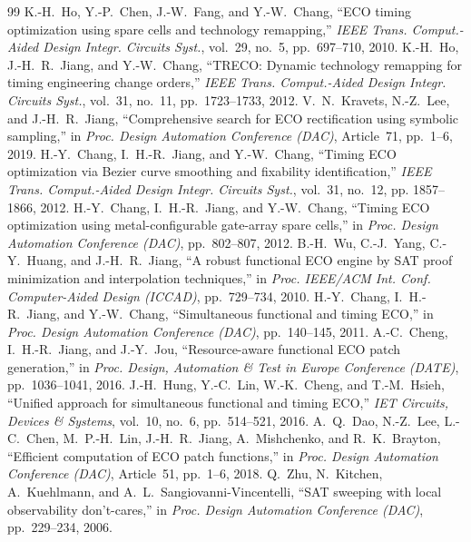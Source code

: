\documentclass[journal]{IEEEtran}
\begin{document}
\begin{thebibliography}{99}
 K.-H.~Ho, Y.-P.~Chen, J.-W.~Fang, and Y.-W.~Chang, ``ECO timing optimization using spare cells and technology remapping,'' \emph{IEEE Trans. Comput.-Aided Design Integr. Circuits Syst.}, vol.~29, no.~5, pp.~697--710, 2010.
 K.-H.~Ho, J.-H.~R.~Jiang, and Y.-W.~Chang, ``TRECO: Dynamic technology remapping for timing engineering change orders,'' \emph{IEEE Trans. Comput.-Aided Design Integr. Circuits Syst.}, vol.~31, no.~11, pp.~1723--1733, 2012.
 V.~N.~Kravets, N.-Z.~Lee, and J.-H.~R.~Jiang, ``Comprehensive search for ECO rectification using symbolic sampling,'' in \emph{Proc. Design Automation Conference (DAC)}, Article~71, pp.~1--6, 2019.
 H.-Y.~Chang, I.~H.-R.~Jiang, and Y.-W.~Chang, ``Timing ECO optimization via Bezier curve smoothing and fixability identification,'' \emph{IEEE Trans. Comput.-Aided Design Integr. Circuits Syst.}, vol.~31, no.~12, pp. 1857--1866, 2012.
 H.-Y.~Chang, I.~H.-R.~Jiang, and Y.-W.~Chang, ``Timing ECO optimization using metal-configurable gate-array spare cells,'' in \emph{Proc. Design Automation Conference (DAC)}, pp.~802--807, 2012.
 B.-H.~Wu, C.-J.~Yang, C.-Y.~Huang, and J.-H.~R.~Jiang, ``A robust functional ECO engine by SAT proof minimization and interpolation techniques,'' in \emph{Proc. IEEE/ACM Int. Conf. Computer-Aided Design (ICCAD)}, pp.~729--734, 2010.
 H.-Y.~Chang, I.~H.-R.~Jiang, and Y.-W.~Chang, ``Simultaneous functional and timing ECO,'' in \emph{Proc. Design Automation Conference (DAC)}, pp.~140--145, 2011.
 A.-C.~Cheng, I.~H.-R.~Jiang, and J.-Y.~Jou, ``Resource-aware functional ECO patch generation,'' in \emph{Proc. Design, Automation \& Test in Europe Conference (DATE)}, pp.~1036--1041, 2016.
 J.-H.~Hung, Y.-C.~Lin, W.-K.~Cheng, and T.-M.~Hsieh, ``Unified approach for simultaneous functional and timing ECO,'' \emph{IET Circuits, Devices \& Systems}, vol.~10, no.~6, pp.~514--521, 2016.
 A.~Q.~Dao, N.-Z.~Lee, L.-C.~Chen, M.~P.-H.~Lin, J.-H.~R.~Jiang, A.~Mishchenko, and R.~K.~Brayton, ``Efficient computation of ECO patch functions,'' in \emph{Proc. Design Automation Conference (DAC)}, Article~51, pp.~1--6, 2018.
 Q.~Zhu, N.~Kitchen, A.~Kuehlmann, and A.~L.~Sangiovanni-Vincentelli, ``SAT sweeping with local observability don't-cares,'' in \emph{Proc. Design Automation Conference (DAC)}, pp.~229--234, 2006.

\end{thebibliography}
\end{document}
